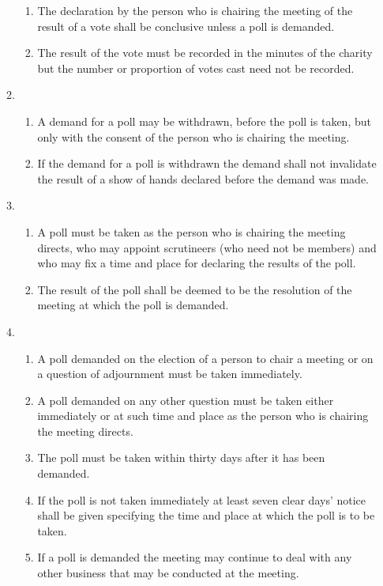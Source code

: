 \begin{enumerate}
\begin{enumerate}
    \begin{enumerate}
    \item
      The declaration by the person who is chairing the meeting of the
      result of a vote shall be conclusive unless a poll is demanded.
    \item
      The result of the vote must be recorded in the minutes of the
      charity but the number or proportion of votes cast need not be
      recorded.
    \end{enumerate}
  \item
    

    \begin{enumerate}
    \item
      A demand for a poll may be withdrawn, before the poll is taken, but
      only with the consent of the person who is chairing the meeting.
    \item
      If the demand for a poll is withdrawn the demand shall not
      invalidate the result of a show of hands declared before the demand
      was made.
    \end{enumerate}
  \item
    

    \begin{enumerate}
    \item
      A poll must be taken as the person who is chairing the meeting
      directs, who may appoint scrutineers (who need not be members) and
      who may fix a time and place for declaring the results of the poll.
    \item
      The result of the poll shall be deemed to be the resolution of the
      meeting at which the poll is demanded.
    \end{enumerate}
  \item
    

    \begin{enumerate}
    \item
      A poll demanded on the election of a person to chair a meeting or
      on a question of adjournment must be taken immediately.
    \item
      A poll demanded on any other question must be taken either
      immediately or at such time and place as the person who is chairing
      the meeting directs.
    \item
      The poll must be taken within thirty days after it has been
      demanded.
    \item
      If the poll is not taken immediately at least seven clear days'
      notice shall be given specifying the time and place at which the
      poll is to be taken.
    \item
      If a poll is demanded the meeting may continue to deal with any
      other business that may be conducted at the meeting.
    \end{enumerate}
  \end{enumerate}


\end{enumerate}
